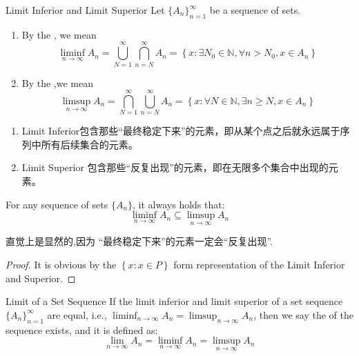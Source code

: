\documentclass[../main.tex]{subfiles}
\begin{document}
\begin{definition}{Limit Inferior and Limit Superior}{}
    Let $\{A_n\}_{n=1}^\infty$ be a sequence of sets.
    \begin{enumerate}
        \item By the , we mean \[
        \liminf_{n \to \infty} A_n = \bigcup_{N=1}^\infty \bigcap_{n=N}^\infty A_n = \left\{ x:  \exists N_0\in \mathbb{N} , \forall n> N_0,x \in A_{n}\right\}
        \]
        \item By the ,we mean \[
        \limsup_{n \to \infty} A_n = \bigcap_{N=1}^\infty \bigcup_{n=N}^\infty A_n =  \left\{ x: \forall N\in \mathbb{N} , \exists n\ge N, x\in A_{n} \right\}
        \]
    \end{enumerate}
    
\end{definition}
\begin{note}
    \begin{enumerate}
        \item Limit Inferior包含那些“最终稳定下来”的元素，即从某个点之后就永远属于序列中所有后续集合的元素。
        \item  Limit Superior 包含那些“反复出现”的元素，即在无限多个集合中出现的元素。
    \end{enumerate}

\end{note}

\begin{proposition}{}{}
    For any sequence of sets $\{A_n\}$, it always holds that:
$$\liminf_{n \to \infty} A_n \subseteq \limsup_{n \to \infty} A_n$$
\end{proposition}
\begin{proofsketch}
    直觉上是显然的,因为 “最终稳定下来”的元素一定会“反复出现”.
\end{proofsketch}

\begin{proof}
    It is obvious by the \(  \left\{ x:x \in P \right\}  \) form representation of the Limit Inferior and Superior.
\end{proof}

\begin{definition}{Limit of a Set Sequence}{}
    If the limit inferior and limit superior of a set sequence $\{A_n\}_{n=1}^\infty$ are equal, i.e., $\liminf_{n \to \infty} A_n = \limsup_{n \to \infty} A_n$, then we say the  of the sequence exists, and it is defined as:
$$\lim_{n \to \infty} A_n = \liminf_{n \to \infty} A_n = \limsup_{n \to \infty} A_n$$
\end{definition}
\end{document}
